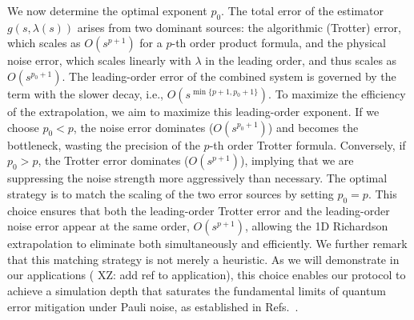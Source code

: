 \documentclass[11pt]{article}
\newcommand{\xz}[1]{{\color{cyan} XZ: #1}}
\begin{document}
We now determine the optimal exponent $p_0$. The total error of the estimator $g(s, \lambda(s))$ arises from two dominant sources: the algorithmic (Trotter) error, which scales as $O(s^{p+1})$ for a $p$-th order product formula, and the physical noise error, which scales linearly with $\lambda$ in the leading order, and thus scales as $O(s^{p_0+1})$.
The leading-order error of the combined system is governed by the term with the slower decay, i.e., $O(s^{\min\{p+1, p_0+1\}})$. To maximize the efficiency of the extrapolation, we aim to maximize this leading-order exponent. If we choose $p_0 < p$, the noise error dominates ($O(s^{p_0+1})$) and becomes the bottleneck, wasting the precision of the $p$-th order Trotter formula. Conversely, if $p_0 > p$, the Trotter error dominates ($O(s^{p+1})$), implying that we are suppressing the noise strength more aggressively than necessary.
The optimal strategy is to match the scaling of the two error sources by setting $p_0 = p$. This choice ensures that both the leading-order Trotter error and the leading-order noise error appear at the same order, $O(s^{p+1})$, allowing the 1D Richardson extrapolation to eliminate both simultaneously and efficiently. We further remark that this matching strategy is not merely a heuristic. As we will demonstrate in our applications (\xz{add ref to application}), this choice enables our protocol to achieve a simulation depth that saturates the fundamental limits of quantum error mitigation under Pauli noise, as established in Refs.~\cite{wang2021noise, cai2021multi}.
\end{document}
